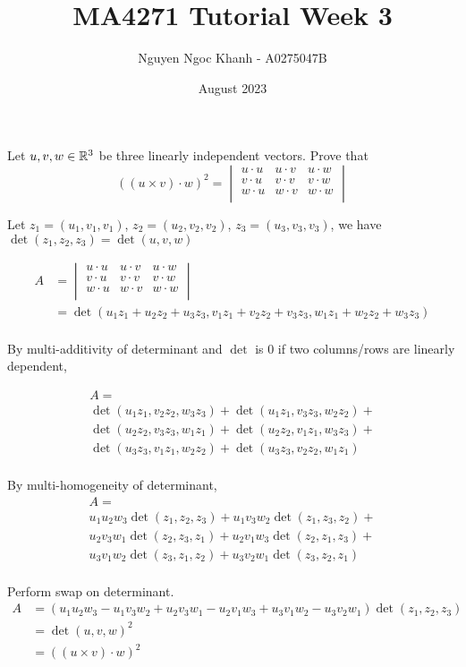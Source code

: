 \documentclass{article}
\title{
    MA4271 Tutorial Week 3
}
\author{Nguyen Ngoc Khanh - A0275047B}
\date{August 2023}
\begin{document}
\maketitle

\begin{problem}
    Let $u, v, w \in \mathbb{R}^3$ be three linearly independent vectors. Prove that 
    $$
        ((u \times v) \cdot w)^2 =
    \begin{vmatrix}
    u \cdot u & u \cdot v & u \cdot w \\ 
    v \cdot u & v \cdot v & v \cdot w \\ 
    w \cdot u & w \cdot v & w \cdot w \\ 
    \end{vmatrix}
    $$
\end{problem}

Let $z_1 = (u_1, v_1, v_1)$, $z_2 = (u_2, v_2, v_2)$, $z_3 = (u_3, v_3, v_3)$, we have $\det(z_1, z_2, z_3) = \det(u, v, w)$

\begin{align*}
A
    &= \begin{vmatrix}
    u \cdot u & u \cdot v & u \cdot w \\ 
    v \cdot u & v \cdot v & v \cdot w \\ 
    w \cdot u & w \cdot v & w \cdot w \\ 
    \end{vmatrix} \\
    &= \det(u_1 z_1 + u_2 z_2 + u_3 z_3, v_1 z_1 + v_2 z_2 + v_3 z_3, w_1 z_1 + w_2 z_2 + w_3 z_3) \\
\end{align*}

By multi-additivity of determinant and $\det$ is $0$ if two columns/rows are linearly dependent,

\begin{multline*}
    A = \\
            \det(u_1 z_1, v_2 z_2, w_3 z_3) + \det(u_1 z_1, v_3 z_3, w_2 z_2) + \\
            \det(u_2 z_2, v_3 z_3, w_1 z_1) + \det(u_2 z_2, v_1 z_1, w_3 z_3) + \\
            \det(u_3 z_3, v_1 z_1, w_2 z_2) + \det(u_3 z_3, v_2 z_2, w_1 z_1)\\
\end{multline*}

By multi-homogeneity of determinant,
\begin{multline*}
    A = \\
            u_1 u_2 w_3\det(z_1, z_2, z_3) + u_1 v_3 w_2 \det(z_1, z_3, z_2) + \\
            u_2 v_3 w_1 \det(z_2, z_3, z_1) + u_2 v_1 w_3 \det(z_2, z_1, z_3) + \\
            u_3 v_1 w_2 \det(z_3, z_1, z_2) + u_3 v_2 w_1 \det(z_3, z_2, z_1)\\
\end{multline*}

Perform swap on determinant.
\begin{align*}
    A 
    &= (u_1 u_2 w_3 - u_1 v_3 w_2 + u_2 v_3 w_1 - u_2 v_1 w_3 + u_3 v_1 w_2 - u_3 v_2 w_1) \det(z_1, z_2, z_3) \\
    &= \det(u, v, w)^2\\
    &= ((u \times v) \cdot w)^2
\end{align*}
\end{document}

